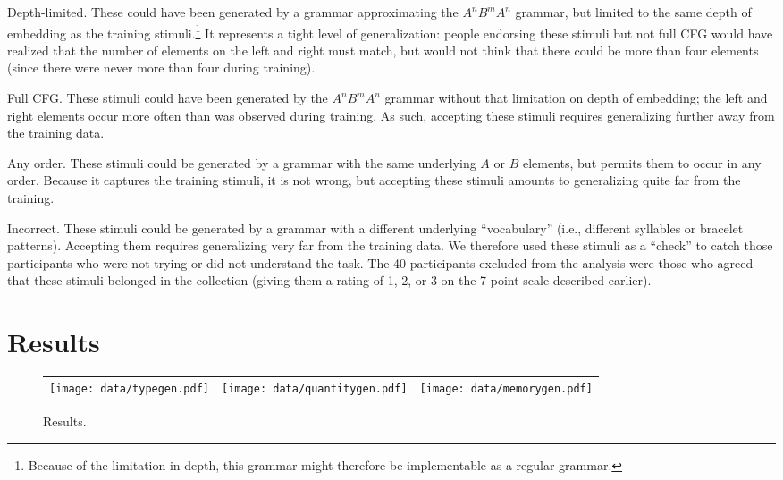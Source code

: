 \documentclass[10pt,letterpaper]{article}
\begin{document}
\textsf{Depth-limited}. These could have been generated by a grammar approximating the $A^nB^mA^n$ grammar, but limited to the same depth of embedding as the training stimuli.\footnote{Because of the limitation in depth, this grammar might therefore be implementable as a regular grammar.}  It represents a tight level of generalization: people endorsing these stimuli but not {\sc full CFG} would have realized that the number of elements on the left and right must match, but would not think that there could be more than four elements (since there were never more than four during training).

\textsf{Full CFG}. These stimuli could have been generated by the $A^nB^mA^n$ grammar without that limitation on depth of embedding; the left and right elements occur more often than was observed during training. As such, accepting these stimuli requires generalizing further away from the training data.

\textsf{Any order}. These stimuli could be generated by a grammar with the same underlying $A$ or $B$ elements, but permits them to occur in any order. Because it captures the training stimuli, it is not wrong, but accepting these stimuli amounts to generalizing quite far from the training.

\textsf{Incorrect}. These stimuli could be generated by a grammar with a different underlying ``vocabulary'' (i.e., different syllables or bracelet patterns). Accepting them requires generalizing very far from the training data. We therefore used these stimuli as a ``check'' to catch those participants who were not trying or did not understand the task. The 40 participants excluded from the analysis were those who agreed that these stimuli belonged in the collection (giving them a rating of 1, 2, or 3 on the 7-point scale described earlier). 


\section{Results}

\begin{figure*}[t]
\begin{center}
\begin{tabular}{ccc}
\texttt{[image: data/typegen.pdf]} & \hspace{-5mm}\texttt{[image: data/quantitygen.pdf]} &  \hspace{-5mm}\texttt{[image: data/memorygen.pdf]} \\ 
\end{tabular}
\caption{Results.}
\label{rawgeneralization}
\end{center}
\end{figure*}
\end{document}
